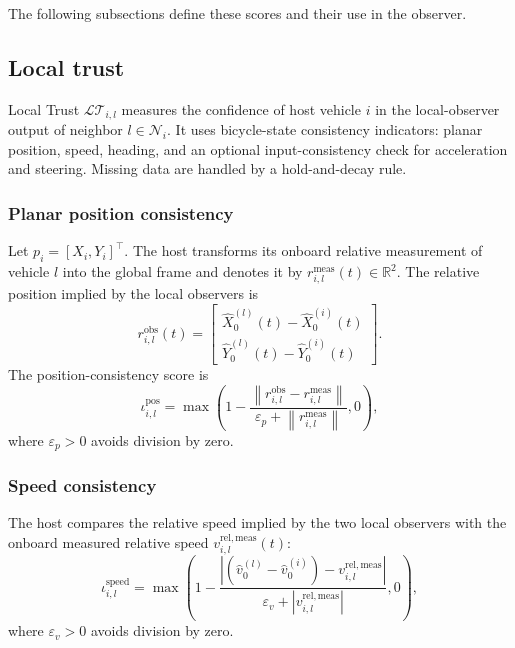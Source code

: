 \documentclass[letterpaper,journal]{IEEEtran}
\def\N{\mathcal{N}} %
\def\LT{\mathcal{LT}} %
\begin{document}
The following subsections define these scores and their use in the observer.


\subsection{Local trust}\label{sub:local_trust}

Local Trust $\LT_{i,l}$ measures the confidence of host vehicle $i$ in the local-observer output of neighbor $l \in \N_i$.
It uses bicycle-state consistency indicators: planar position, speed, heading, and an optional input-consistency check for acceleration and steering. Missing data are handled by a hold-and-decay rule.

\subsubsection{Planar position consistency}
Let $p_i=[X_i,Y_i]^\top$. The host transforms its onboard relative measurement of vehicle $l$ into the global frame and denotes it by $r_{i,l}^{\mathrm{meas}}(t)\in\mathbb{R}^2$. The relative position implied by the local observers is
\begin{equation*}
    r_{i,l}^{\mathrm{obs}}(t)=
    \begin{bmatrix}\hat X_0^{(l)}(t)-\hat X_0^{(i)}(t)\\
    \hat Y_0^{(l)}(t)-\hat Y_0^{(i)}(t)
    \end{bmatrix}.
\end{equation*}
The position-consistency score is
\begin{equation*}
    \iota_{i,l}^{\text{pos}}
    =
    \max\left(
    1 -
    \frac{\left\|r_{i,l}^{\mathrm{obs}}-r_{i,l}^{\mathrm{meas}}\right\|}
    {\varepsilon_p+\left\|r_{i,l}^{\mathrm{meas}}\right\|},
    0
    \right),
\end{equation*}
where $\varepsilon_p>0$ avoids division by zero.

\subsubsection{Speed consistency}
The host compares the relative speed implied by the two local observers with the onboard measured relative speed $v_{i,l}^{\mathrm{rel,meas}}(t)$:
\begin{equation*}
    \iota_{i,l}^{\text{speed}}
    =
    \max\left(
    1 -
    \frac{\left|(\hat{v}_{0}^{(l)}-\hat{v}_{0}^{(i)})-v_{i,l}^{\mathrm{rel,meas}}\right|}
    {\varepsilon_v+\left|v_{i,l}^{\mathrm{rel,meas}}\right|},
    0
    \right),
\end{equation*}
where $\varepsilon_v>0$ avoids division by zero.
\end{document}
